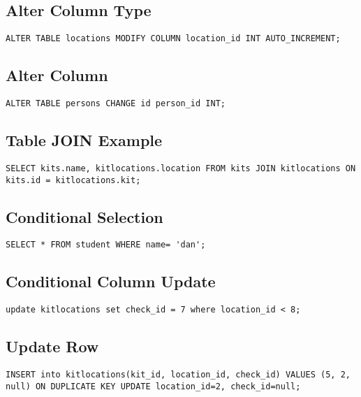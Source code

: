 \documentclass{article}
\begin{document}
\begin{multicols}{3}
\subsection{Alter Column Type}
\lstinline|ALTER TABLE locations MODIFY COLUMN location_id INT AUTO_INCREMENT;|

\subsection{Alter Column}
\lstinline|ALTER TABLE persons CHANGE id person_id INT;|

\subsection{Table JOIN Example}
\lstinline|SELECT kits.name, kitlocations.location FROM kits JOIN kitlocations ON kits.id = kitlocations.kit;|

\subsection{Conditional Selection}
\lstinline|SELECT * FROM student WHERE name= 'dan';|

\subsection{Conditional Column Update}
\lstinline|update kitlocations set check_id = 7 where location_id < 8;|

\subsection{Update Row}
\lstinline|INSERT into kitlocations(kit_id, location_id, check_id) VALUES (5, 2, null) ON DUPLICATE KEY UPDATE location_id=2, check_id=null;|

\end{multicols}
\end{document}
